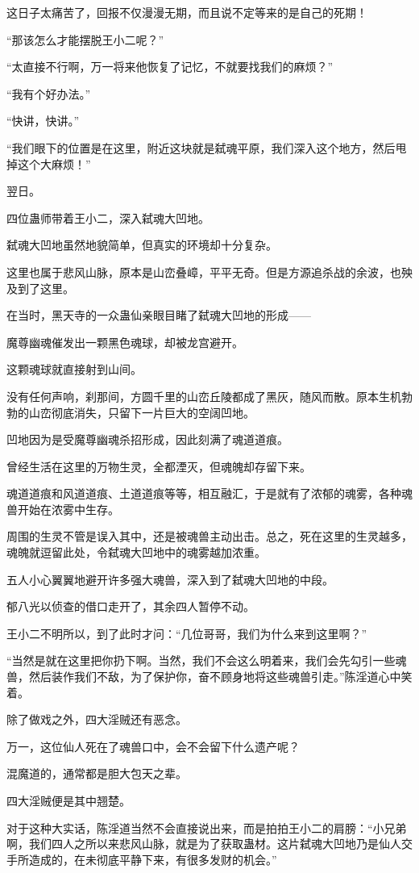 \begin{this_body}
这日子太痛苦了，回报不仅漫漫无期，而且说不定等来的是自己的死期！

“那该怎么才能摆脱王小二呢？”

“太直接不行啊，万一将来他恢复了记忆，不就要找我们的麻烦？”

“我有个好办法。”

“快讲，快讲。”

“我们眼下的位置是在这里，附近这块就是弑魂平原，我们深入这个地方，然后甩掉这个大麻烦！”

翌日。

四位蛊师带着王小二，深入弑魂大凹地。

弑魂大凹地虽然地貌简单，但真实的环境却十分复杂。

这里也属于悲风山脉，原本是山峦叠嶂，平平无奇。但是方源追杀战的余波，也殃及到了这里。

在当时，黑天寺的一众蛊仙亲眼目睹了弑魂大凹地的形成——

魔尊幽魂催发出一颗黑色魂球，却被龙宫避开。

这颗魂球就直接射到山间。

没有任何声响，刹那间，方圆千里的山峦丘陵都成了黑灰，随风而散。原本生机勃勃的山峦彻底消失，只留下一片巨大的空阔凹地。

凹地因为是受魔尊幽魂杀招形成，因此刻满了魂道道痕。

曾经生活在这里的万物生灵，全都湮灭，但魂魄却存留下来。

魂道道痕和风道道痕、土道道痕等等，相互融汇，于是就有了浓郁的魂雾，各种魂兽开始在浓雾中生存。

周围的生灵不管是误入其中，还是被魂兽主动出击。总之，死在这里的生灵越多，魂魄就逗留此处，令弑魂大凹地中的魂雾越加浓重。

五人小心翼翼地避开许多强大魂兽，深入到了弑魂大凹地的中段。

郁八光以侦查的借口走开了，其余四人暂停不动。

王小二不明所以，到了此时才问：“几位哥哥，我们为什么来到这里啊？”

“当然是就在这里把你扔下啊。当然，我们不会这么明着来，我们会先勾引一些魂兽，然后装作我们不敌，为了保护你，奋不顾身地将这些魂兽引走。”陈淫道心中笑着。

除了做戏之外，四大淫贼还有恶念。

万一，这位仙人死在了魂兽口中，会不会留下什么遗产呢？

混魔道的，通常都是胆大包天之辈。

四大淫贼便是其中翘楚。

对于这种大实话，陈淫道当然不会直接说出来，而是拍拍王小二的肩膀：“小兄弟啊，我们四人之所以来悲风山脉，就是为了获取蛊材。这片弑魂大凹地乃是仙人交手所造成的，在未彻底平静下来，有很多发财的机会。”

\end{this_body}

